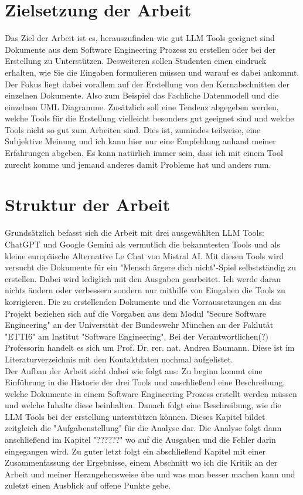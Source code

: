 \section{Zielsetzung der Arbeit}  \label{Zielsetzung der Arbeit}

Das Ziel der Arbeit ist es, herauszufinden wie gut LLM Tools geeignet sind Dokumente aus dem Software Engineering Prozess zu erstellen oder bei der Erstellung zu 
Unterstützen. Desweiteren sollen Studenten einen eindruck erhalten, wie Sie die Eingaben formulieren müssen und warauf es dabei ankommt. Der Fokus liegt dabei 
vorallem auf der Erstellung von den Kernabschnitten der einzelnen Dokumente. Also zum Beispiel das Fachliche Datenmodell und die einzelnen UML Diagramme.
Zusätzlich soll eine Tendenz abgegeben werden, welche Tools für die Erstellung vielleicht besonders gut geeignet sind und welche Tools nicht so gut zum Arbeiten sind.
Dies ist, zumindes teilweise, eine Subjektive Meinung und ich kann hier nur eine Empfehlung anhand meiner Erfahrungen abgeben. Es kann natürlich immer sein, dass
ich mit einem Tool zurecht komme und jemand anderes damit Probleme hat und anders rum.


\section{Struktur der Arbeit}  \label{Struktur der Arbeit}

Grundsätzlich befasst sich die Arbeit mit drei ausgewählten LLM Tools: ChatGPT und Google Gemini als vermutlich die bekanntesten Tools und als kleine europäische 
Alternative Le Chat von Mistral AI. Mit diesen Tools wird versucht die Dokumente für ein "Mensch ärgere dich nicht"-Spiel selbstständig zu erstellen. Dabei wird 
lediglich mit den Ausgaben gearbeitet. Ich werde daran nichts ändern oder verbessern sondern nur mithilfe von Eingaben die Tools zu korrigieren. Die zu erstellenden 
Dokumente und die Vorraussetzungen an das Projekt beziehen sich auf die Vorgaben aus dem Modul "Secure Software Engineering" an der Universität der Bundeswehr München 
an der Faklutät "ETTI6" am Institut "Software Engineering". Bei der Verantwortlichen(?) Professorin handelt es sich um Prof. Dr. rer. nat. Andrea Baumann. Diese ist 
im Literaturverzeichnis mit den Kontaktdaten nochmal aufgelistet.\\

Der Aufbau der Arbeit sieht dabei wie folgt aus: Zu beginn kommt eine Einführung in die Historie der drei Tools und anschließend eine Beschreibung, welche 
Dokumente in einem Software Engineering Prozess erstellt werden müssen und welche Inhalte diese beinhalten. Danach folgt eine Beschreibung, wie die LLM Tools 
bei der erstellung unterstützen können. Dieses Kapitel bildet zeitgleich die "Aufgabenstellung" für die Analyse dar. Die Analyse folgt dann anschließend im 
Kapitel "??????" wo auf die Ausgaben und die Fehler darin eingegangen wird. Zu guter letzt folgt ein abschließend Kapitel mit einer Zusammenfassung der Ergebnisse,
einem Abschnitt wo ich die Kritik an der Arbeit und meiner Herangehensweise übe und was man besser machen kann und zuletzt einen Ausblick auf offene Punkte gebe.
